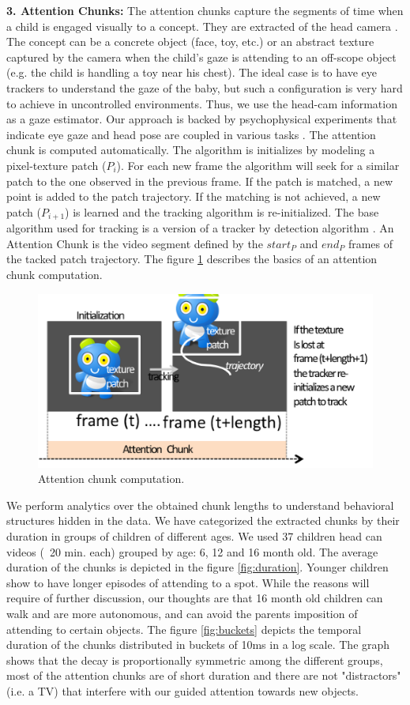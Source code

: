 \documentclass[10pt,letterpaper]{article}
\begin{document}
{\bf 3. Attention Chunks:} 
The attention chunks capture the segments of time when a child is engaged visually to a concept. They are extracted of the head camera
. The concept can be a concrete object (face, toy, etc.) or an abstract texture captured by the camera when the child's gaze is attending to an off-scope object (e.g. the child is handling a toy near his chest). The ideal case is to have eye trackers to understand the gaze of the baby, but such a configuration is very hard to achieve in uncontrolled environments. Thus, we use the head-cam information as a gaze estimator. Our approach is backed by psychophysical experiments that indicate eye gaze and head pose are coupled in various tasks \cite{Land1,Pelz}. The attention chunk is computed automatically. The algorithm is initializes by modeling a pixel-texture patch ($P_{i}$). 
For each new frame the algorithm will seek for a similar patch to the one observed in the previous frame. If the patch is matched, a new point is added to the patch trajectory. If the matching is not achieved, a new patch ($P_{i+1}$) is learned and the tracking algorithm is re-initialized. The base algorithm used for tracking is a version of a tracker by detection algorithm \cite{kalal}. An Attention Chunk is the video segment defined by the $start_{P}$ and $end_{P}$ frames of the tacked patch trajectory.
The figure \ref{fig:chunk} describes the basics of an attention chunk computation.\\
\begin{figure}[h]
\begin{center}
        \includegraphics[width=0.5\linewidth]{Image/Attchunk}      
          \end{center}
    \caption{Attention chunk computation.}
   \label{fig:chunk}
\end{figure}
We perform analytics over the obtained chunk lengths to understand behavioral structures hidden in the data. We have categorized the extracted chunks by their duration in groups of children of different ages. We used 37 children head can videos (~20 min. each) grouped by age: 6, 12 and 16 month old. The average duration of the chunks is depicted in the figure \ref{fig:duration}. Younger children show to have longer episodes of attending to a spot. While the reasons will require of further discussion, our thoughts are that 16 month old children can walk and are more autonomous, and can avoid the parents imposition of attending to certain objects. The figure \ref{fig:buckets} depicts the temporal duration of the chunks distributed in buckets of 10ms in a log scale. The graph shows that the decay is proportionally symmetric among the different groups, most of the attention chunks are of short duration and there are not "distractors" (i.e. a TV) that interfere with our guided attention towards new objects. 
\end{document}
